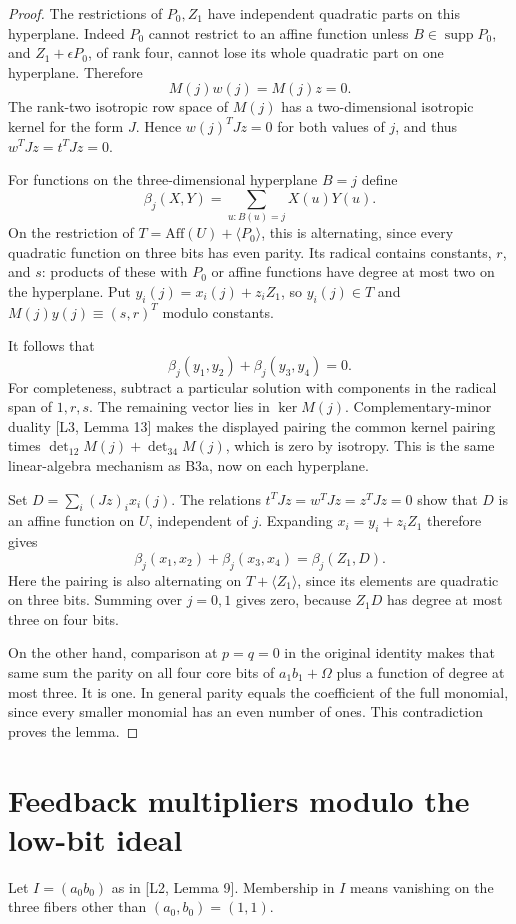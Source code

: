 \documentclass[11pt,a4paper]{article}
\newcommand{\Aff}{\mathrm{Aff}}
\newcommand{\supp}{\operatorname{supp}}
\begin{document}
\begin{proof}
The restrictions of $P_0,Z_1$ have independent quadratic parts on this hyperplane. Indeed $P_0$ cannot restrict to an affine function unless $B\in\supp P_0$, and $Z_1+\epsilon P_0$, of rank four, cannot lose its whole quadratic part on one hyperplane. Therefore
\[
M(j)w(j)=M(j)z=0.
\]
The rank-two isotropic row space of $M(j)$ has a two-dimensional isotropic kernel for the form $J$. Hence $w(j)^TJz=0$ for both values of $j$, and thus $w^TJz=t^TJz=0$.

For functions on the three-dimensional hyperplane $B=j$ define
\[
\beta_j(X,Y)=\sum_{u:B(u)=j}X(u)Y(u).
\]
On the restriction of $T=\Aff(U)+\langle P_0\rangle$, this is alternating, since every quadratic function on three bits has even parity. Its radical contains constants, $r$, and $s$: products of these with $P_0$ or affine functions have degree at most two on the hyperplane. Put $y_i(j)=x_i(j)+z_iZ_1$, so $y_i(j)\in T$ and $M(j)y(j)\equiv(s,r)^T$ modulo constants.

It follows that
\[
\beta_j(y_1,y_2)+\beta_j(y_3,y_4)=0.
\]
For completeness, subtract a particular solution with components in the radical span of $1,r,s$. The remaining vector lies in $\ker M(j)$. Complementary-minor duality [L3, Lemma 13] makes the displayed pairing the common kernel pairing times $\det_{12}M(j)+\det_{34}M(j)$, which is zero by isotropy. This is the same linear-algebra mechanism as B3a, now on each hyperplane.

Set $D=\sum_i(Jz)_i x_i(j)$. The relations $t^TJz=w^TJz=z^TJz=0$ show that $D$ is an affine function on $U$, independent of $j$. Expanding $x_i=y_i+z_iZ_1$ therefore gives
\[
\beta_j(x_1,x_2)+\beta_j(x_3,x_4)=\beta_j(Z_1,D).
\]
Here the pairing is also alternating on $T+\langle Z_1\rangle$, since its elements are quadratic on three bits. Summing over $j=0,1$ gives zero, because $Z_1D$ has degree at most three on four bits.

On the other hand, comparison at $p=q=0$ in the original identity makes that same sum the parity on all four core bits of $a_1b_1+\Omega$ plus a function of degree at most three. It is one. In general parity equals the coefficient of the full monomial, since every smaller monomial has an even number of ones. This contradiction proves the lemma.
\end{proof}

\section{Feedback multipliers modulo the low-bit ideal}
Let $I=(a_0b_0)$ as in [L2, Lemma 9]. Membership in $I$ means vanishing on the three fibers other than $(a_0,b_0)=(1,1)$.
\end{document}
